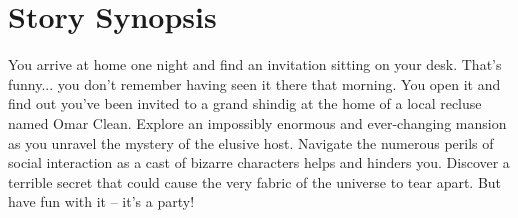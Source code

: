 \section{Story Synopsis}

You arrive at home one night and find an invitation sitting on your desk. That's funny... you don't remember having seen it there that morning. You open it and find out you've been invited to a grand shindig at the home of a local recluse named Omar Clean. Explore an impossibly enormous and ever-changing mansion as you unravel the mystery of the elusive host.  Navigate the numerous perils of social interaction as a cast of bizarre characters helps and hinders you. Discover a terrible secret that could cause the very fabric of the universe to tear apart. But have fun with it -- it's a party!